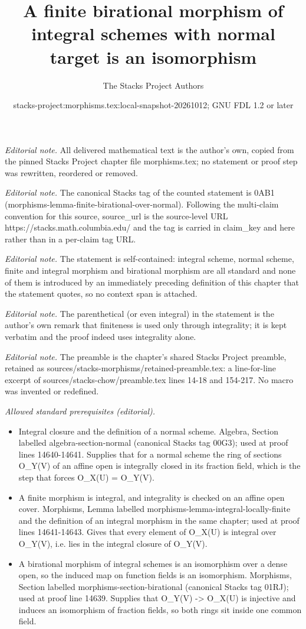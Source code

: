 \documentclass[10pt,a4paper]{amsart}
\title{A finite birational morphism of integral schemes with normal target is an isomorphism}
\author{The Stacks Project Authors}
\date{stacks-project:morphisms.tex:local-snapshot-20261012; GNU FDL 1.2 or later}
\theoremstyle{plain}
\theoremstyle{definition}
\theoremstyle{remark}
\numberwithin{equation}{subsection}
\begin{document}
\maketitle
\noindent\textit{Editorial note.} All delivered mathematical text is the author's own, copied from the pinned Stacks Project chapter file morphisms.tex; no statement or proof step was rewritten, reordered or removed.\par\medskip
\noindent\textit{Editorial note.} The canonical Stacks tag of the counted statement is 0AB1 (morphisms-lemma-finite-birational-over-normal). Following the multi-claim convention for this source, source\_url is the source-level URL https://stacks.math.columbia.edu/ and the tag is carried in claim\_key and here rather than in a per-claim tag URL.\par\medskip
\noindent\textit{Editorial note.} The statement is self-contained: integral scheme, normal scheme, finite and integral morphism and birational morphism are all standard and none of them is introduced by an immediately preceding definition of this chapter that the statement quotes, so no context span is attached.\par\medskip
\noindent\textit{Editorial note.} The parenthetical (or even integral) in the statement is the author's own remark that finiteness is used only through integrality; it is kept verbatim and the proof indeed uses integrality alone.\par\medskip
\noindent\textit{Editorial note.} The preamble is the chapter's shared Stacks Project preamble, retained as sources/stacks-morphisms/retained-preamble.tex: a line-for-line excerpt of sources/stacks-chow/preamble.tex lines 14-18 and 154-217. No macro was invented or redefined.\par\medskip
\noindent\textit{Allowed standard prerequisites (editorial).}\begin{itemize}
\item Integral closure and the definition of a normal scheme. Algebra, Section labelled algebra-section-normal (canonical Stacks tag 00G3); used at proof lines 14640-14641. Supplies that for a normal scheme the ring of sections O\_Y(V) of an affine open is integrally closed in its fraction field, which is the step that forces O\_X(U) = O\_Y(V).
\item A finite morphism is integral, and integrality is checked on an affine open cover. Morphisms, Lemma labelled morphisms-lemma-integral-locally-finite and the definition of an integral morphism in the same chapter; used at proof lines 14641-14643. Gives that every element of O\_X(U) is integral over O\_Y(V), i.e. lies in the integral closure of O\_Y(V).
\item A birational morphism of integral schemes is an isomorphism over a dense open, so the induced map on function fields is an isomorphism. Morphisms, Section labelled morphisms-section-birational (canonical Stacks tag 01RJ); used at proof line 14639. Supplies that O\_Y(V) -> O\_X(U) is injective and induces an isomorphism of fraction fields, so both rings sit inside one common field.
\end{itemize}\medskip
\end{document}
